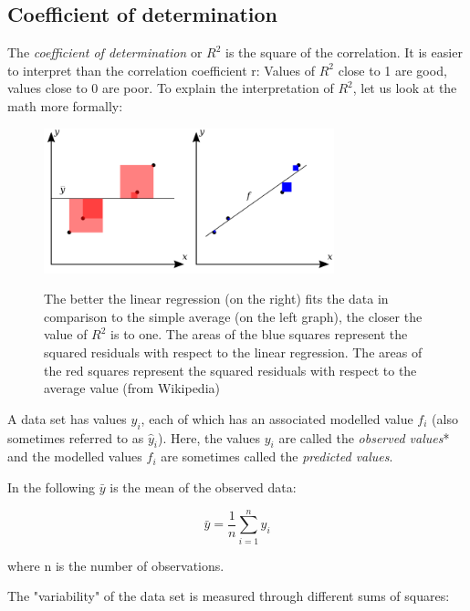 \subsection{Coefficient of determination}

The \emph{coefficient of determination}  or $R^2$ is the square of the correlation. It is easier to interpret than the correlation coefficient r: Values of $R^2$ close to 1 are good, values close to 0 are poor. To explain the interpretation of $R^2$, let us look at the math more formally:

\begin{figure}
  \centering
  \includegraphics[width=0.75\textwidth]{../Images/Coefficient_of_Determination.png}\\
  \caption{The better the linear regression (on the right) fits the data in comparison to the simple average (on the left graph), the closer the value of $R^2$ is to one. The areas of the blue squares represent the squared residuals with respect to the linear regression. The areas of the red squares represent the squared residuals with respect to the average value (from Wikipedia)}\label{fig:CoefDetermination}
\end{figure}

A data set has values $y_i$, each of which has an associated modelled value $f_i$ (also sometimes referred to as $\hat{y}_i$). Here, the values $y_i$ are called the \emph{observed values}* and the modelled values $f_i$ are sometimes called the \emph{predicted values}.

In the following $\bar{y}$ is the mean of the observed data:

\begin{equation}
  \bar{y}=\frac{1}{n}\sum_{i=1}^n y_i
\end{equation}

where n is the number of observations.

The "variability" of the data set is measured through different sums of squares:

